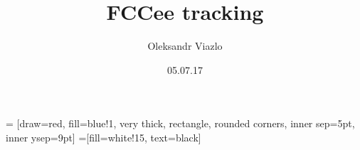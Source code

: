 \documentclass[8pt]{beamer}
\newif\ifplacelogo %
\begin{document}
\newcommand{\yRefPosOne}{0.0}
\newcommand{\xRefPosOne}{0.0}
\newcommand{\yRefPosTwo}{0.0}
\newcommand{\xRefPosTwo}{0.0}
\newcommand{\yRefIncrementOne}{0.0}
\newcommand{\xRefIncrementOne}{0.0}
\newcommand{\yRefIncrementTwo}{0.0}
\newcommand{\xRefIncrementTwo}{0.0}

\graphicspath{{/home/oviazlo/Desktop/beamerPresentations/FCCee/pictures/}}



\title[FCCee tracking \hspace{17em}\insertframenumber/
\inserttotalframenumber]{FCCee tracking}


	\author{Oleksandr Viazlo}
	\date{05.07.17\\}

\placelogofalse

\newcommand{\channel}{enuqqbb}
\newcommand{\goodChannel}{$t\bar{t} \longrightarrow W^{+}bW^{-}\bar{b} \longrightarrow q\bar{q}be^{-}\bar{\nu_{e}}\bar{b} + e^{+}\nu_{e}bq\bar{q}\bar{b}$}
\newcommand{\myNodeOne}{\tikz[baseline,inner sep=1pt] \node[anchor=base]}
\newcommand{\myNodeTwo}{\tikz[baseline,inner sep=1pt] \node[anchor=base]}

 = [draw=red, fill=blue!1, very thick,
    rectangle, rounded corners, inner sep=5pt, inner ysep=9pt]
 =[fill=white!15, text=black]
\end{document}
